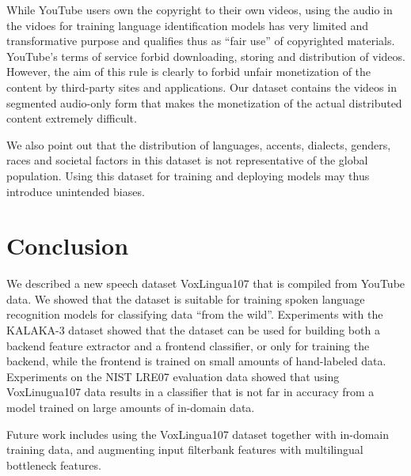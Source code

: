 \documentclass{article}
\begin{document}
While YouTube users own the copyright to their own videos, using the audio in the vidoes for training language identification models has very limited and transformative purpose and qualifies  thus as ``fair use'' of copyrighted materials. YouTube's terms of service forbid downloading, storing and distribution of videos. However, the aim of this rule is clearly to forbid unfair monetization of the content by third-party sites and applications. Our dataset contains the videos in segmented audio-only form that makes the monetization of the actual distributed content extremely difficult.

We also point out that the distribution of languages, accents, dialects, genders, races and societal factors in this dataset is not representative of the global population. Using this dataset for training and deploying models may thus introduce unintended biases.

\section{Conclusion}

We described a new speech dataset VoxLingua107 that is compiled from YouTube data. We showed that the dataset is suitable for training spoken language recognition models for classifying data ``from the wild''. Experiments with the KALAKA-3 dataset showed that the dataset can be used for building both a backend feature extractor and a frontend classifier, or only for training the backend, while the frontend is trained on small amounts of hand-labeled data.
Experiments on the NIST LRE07 evaluation data showed that using VoxLinugua107 data  results in a classifier that is not far in accuracy from a model trained on large amounts of in-domain data. 

Future work includes using the VoxLingua107 dataset together with in-domain training data, and augmenting input filterbank features with multilingual bottleneck features.





\end{document}
